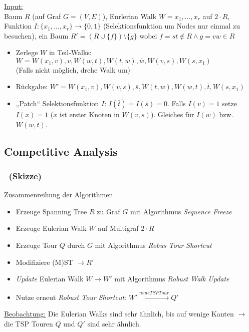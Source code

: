 \begin{frame}
    \frametitle{\insertsubsection}
    \underline{Input:}\\
    \vspace{.7em}
    Baum $R$ (auf Graf $G=(V,E)$), Eurlerian Walk $W = x_1, ..., x_r$ auf $2\cdot R$, Funktion $I: \{x_1,...,x_r\} \rightarrow \{0, 1\}$ (Selektionsfunktion um Nodes nur einmal zu besuchen), ein Baum $R' = (R \cup \{f\}) \setminus \{g\}$ wobei $f = st \notin R \wedge g = vw \in R$
    \vspace{.8em}
    \begin{itemize}
        \itemsep\setlength{.8em}
        \item Zerlege $W$ in Teil-Walks:\\
        $W = W(x_1, v), v, W(w, t), W(t, w), \bar{w}, W(v, s), W(s, x_1)$\\
        (Falls nicht möglich, drehe Walk um)
        \item Rückgabe: $W' = W(x_1, v), W(v, s), \bar{s}, W(t, w), W(w, t), \bar{t}, W(s, x_1)$
        \item „Patch“ Selektionsfunktion $I$: $I(\bar{t})=I(\bar{s}) = 0$. Falls $I(v)=1$ setze $I(x)=1$ ($x$ ist erster Knoten in $W(v,s)$). Gleiches für $I(w)$ bzw. $W(w,t)$.
    \end{itemize}
\end{frame}

\subsection{Competitive Analysis}
\begin{frame}
    \frametitle{\insertsubsection~(Skizze)}
    \begin{block}{Zusammenreihung der Algorithmen}
        \vspace{.6em}
        \begin{itemize}
            \itemsep\setlength{.8em}
            \item Erzeuge Spanning Tree $R$ zu Graf $G$ mit Algorithmus \emph{Sequence Freeze}
            \item Erzeuge Eulerian Walk $W$ auf Multigraf $2\cdot R$
            \item Erzeuge Tour $Q$ durch $G$ mit Algorithmus \emph{Robus Tour Shortcut}
            \item Modifiziere (M)ST $\rightarrow R'$
            \item \emph{Update} Eulerian Walk $W \rightarrow W'$ mit Algorithmus \emph{Robust Walk Update}
            \item Nutze erneut \emph{Robust Tour Shortcut}: $W' \xrightarrow{neue TSP Tour} Q'$
        \end{itemize}
        \vspace{.1em}
    \end{block}
    \vspace{.1em}
    \underline{Beobachtung:} Die Eulerian Walks sind sehr ähnlich, bis auf wenige Kanten $\rightarrow$ die TSP Touren $Q$ und $Q'$ sind sehr ähnlich.
\end{frame}

